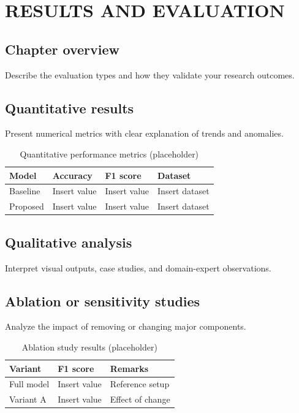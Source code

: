 \chapter{RESULTS AND EVALUATION}
\section{Chapter overview}
Describe the evaluation types and how they validate your research outcomes.

\section{Quantitative results}
Present numerical metrics with clear explanation of trends and anomalies.

\begin{table}[H]
    \centering
    \begin{tabular}{|l|l|l|l|}
        \hline
        Model & Accuracy & F1 score & Dataset \\
        \hline
        Baseline & Insert value & Insert value & Insert dataset \\
        Proposed & Insert value & Insert value & Insert dataset \\
        \hline
    \end{tabular}
    \caption{Quantitative performance metrics (placeholder)}
    \label{tab:quantitative-results}
\end{table}

\section{Qualitative analysis}
Interpret visual outputs, case studies, and domain-expert observations.

\section{Ablation or sensitivity studies}
Analyze the impact of removing or changing major components.

\begin{table}[H]
    \centering
    \begin{tabular}{|l|l|l|}
        \hline
        Variant & F1 score & Remarks \\
        \hline
        Full model & Insert value & Reference setup \\
        Variant A & Insert value & Effect of change \\
        \hline
    \end{tabular}
    \caption{Ablation study results (placeholder)}
    \label{tab:ablation-results}
\end{table}

